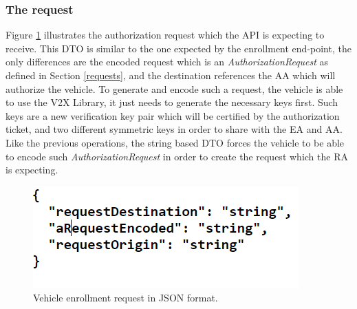 \subsubsection{The request}
Figure \ref{fig:auth_req} illustrates the authorization request which the API is expecting to receive. This DTO is similar to the one expected by the enrollment end-point, the only differences are the encoded request which is an \textit{AuthorizationRequest} as defined in Section \ref{requests}, and the destination references the AA which will authorize the vehicle. To generate and encode such a request, the vehicle is able to use the V2X Library, it just needs to generate the necessary keys first. Such keys are a new verification key pair which will be certified by the authorization ticket, and two different symmetric keys in order to share with the EA and AA. Like the previous operations, the string based DTO forces the vehicle to be able to encode such \textit{AuthorizationRequest} in order to create the request which the RA is expecting.

\begin{figure}[!h]
	\centering
	\includegraphics[width=0.5
	\textwidth]{Figures/auth_req}
	\caption{\label{fig:auth_req}Vehicle enrollment request in JSON format.}
\end{figure}


